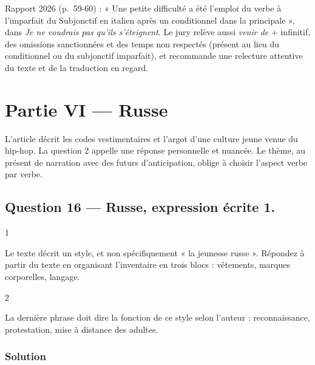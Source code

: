 \documentclass[11pt,a4paper]{article}
\begin{document}
\begin{jury}

Rapport 2026 (p.~59-60) : « Une petite difficulté a été l'emploi du verbe à l'imparfait du Subjonctif en italien après un conditionnel dans la principale », dans \emph{Je ne voudrais pas qu'ils s'éteignent}. Le jury relève aussi \emph{venir de} + infinitif, des omissions sanctionnées et des temps non respectés (présent au lieu du conditionnel ou du subjonctif imparfait), et recommande une relecture attentive du texte et de la traduction en regard.

\end{jury}

\hypertarget{partie-vi-russe}{%
\section{Partie VI --- Russe}\label{partie-vi-russe}}

L'article décrit les codes vestimentaires et l'argot d'une culture jeune venue du hip-hop. La question 2 appelle une réponse personnelle et nuancée. Le thème, au présent de narration avec des futurs d'anticipation, oblige à choisir l'aspect verbe par verbe.

\hypertarget{question-16-russe-expression-uxe9crite-1.}{%
\subsection{Question 16 --- Russe, expression écrite 1.}\label{question-16-russe-expression-uxe9crite-1.}}

\begin{indication}{1}

Le texte décrit un style, et non spécifiquement « la jeunesse russe ». Répondez à partir du texte en organisant l'inventaire en trois blocs : vêtements, marques corporelles, langage.

\end{indication}

\begin{indication}{2}

La dernière phrase doit dire la fonction de ce style selon l'auteur : reconnaissance, protestation, mise à distance des adultes.

\end{indication}

\hypertarget{solution-15}{%
\subsubsection{Solution}\label{solution-15}}
\end{document}
